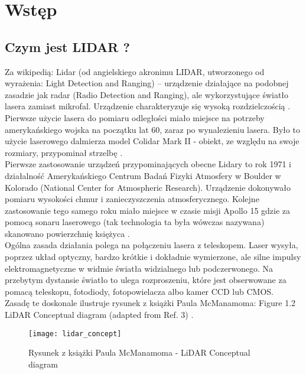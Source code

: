 \section {Wstęp}
\subsection {Czym jest LIDAR ?}

Za wikipedią:
Lidar (od angielskiego akronimu LIDAR, utworzonego od wyrażenia: Light Detection and Ranging)
– urządzenie działające na podobnej zasadzie jak radar (Radio Detection and Ranging), ale
wykorzystujące światło lasera zamiast mikrofal. Urządzenie charakteryzuje się wysoką
rozdzielczością \cite{lidar_pl}.\\

Pierwsze użycie lasera do pomiaru odległości miało miejsce na potrzeby amerykańskiego 
wojska na początku lat 60, zaraz po wynalezieniu lasera. Było to użycie laserowego dalmierza 
model Colidar Mark II - obiekt, ze względu na swoje rozmiary, przypominał strzelbę \cite{lidar_en}.\\

Pierwsze zastosowanie urządzeń przypominających obecne Lidary to rok 1971 i działalność
Amerykańskiego Centrum Badań Fizyki Atmosfery w Boulder w Kolorado (National Center for
Atmospheric Research). Urządzenie dokonywało pomiaru wysokości chmur i zanieczyszczenia
atmosferycznego. Kolejne zastosowanie tego samego roku miało miejsce w czasie misji
Apollo 15 gdzie za pomocą sonaru laserowego (tak technologia ta była wówczas nazywana)
skanowano powierzchnię księżyca \cite{lidar_en}.\\

Ogólna zasada działania polega na połączeniu lasera z teleskopem. Laser wysyła, poprzez 
układ optyczny, bardzo krótkie i dokładnie wymierzone, ale silne impulsy elektromagnetyczne
w widmie światła widzialnego lub podczerwonego. Na przebytym dystansie światło to ulega
rozproszeniu, które jest obserwowane za pomacą teleskopu, fotodiody, fotopowielacza albo
kamer CCD lub CMOS. \\

Zasadę te doskonale ilustruje rysunek z książki Paula McManamoma:
Figure 1.2 LiDAR Conceptual diagram (adapted from Ref. 3) \cite{mcmanamom}.\\
\begin{figure}[h]
    \centering
    \texttt{[image: lidar\_concept]}
    \caption{Rysunek z książki Paula McManamoma - LiDAR Conceptual diagram}
    \label{fig:lidar_concept}
\end{figure}

